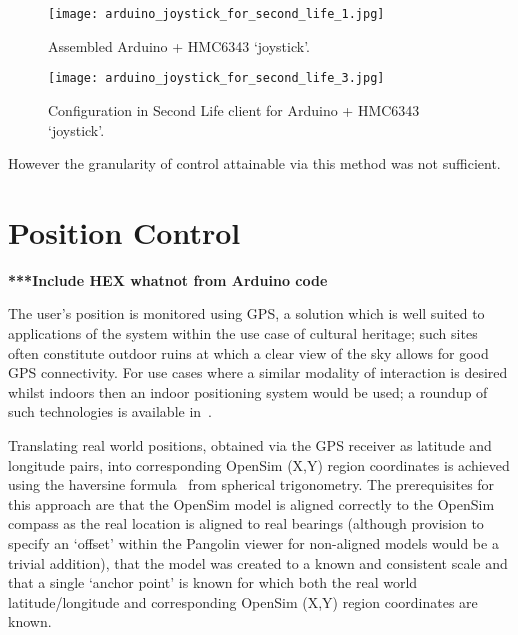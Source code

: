 \begin{figure}[h]
\centering
  \texttt{[image: arduino\_joystick\_for\_second\_life\_1.jpg]}
  \caption{Assembled Arduino + HMC6343 `joystick'.}
  \label{arduino_joystick_for_second_life_1.jpg}
\end{figure}

\begin{figure}[h]
\centering
  \texttt{[image: arduino\_joystick\_for\_second\_life\_3.jpg]}
  \caption{Configuration in Second Life client for Arduino + HMC6343 `joystick'.}
  \label{arduino_joystick_for_second_life_3.jpg}
\end{figure}

However the granularity of control attainable via this method was not sufficient.


\section{Position Control}

\textbf{***Include HEX whatnot from Arduino code}

The user's position is monitored using GPS, a solution which is well suited to applications of the system within the use case of cultural heritage; such sites often constitute outdoor ruins at which a clear view of the sky allows for good GPS connectivity. For use cases where a similar modality of interaction is desired whilst indoors then an indoor positioning system would be used; a roundup of such technologies is available in~\cite{Mautz2012}.

Translating real world positions, obtained via the GPS receiver as latitude and longitude pairs, into corresponding OpenSim (X,Y) region coordinates is achieved using the haversine formula~\cite{Gellert1989} from spherical trigonometry. The prerequisites for this approach are that the OpenSim model is aligned correctly to the OpenSim compass as the real location is aligned to real bearings (although provision to specify an `offset' within the Pangolin viewer for non-aligned models would be a trivial addition), that the model was created to a known and consistent scale and that a single `anchor point' is known for which both the real world latitude/longitude and corresponding OpenSim (X,Y) region coordinates are known.

